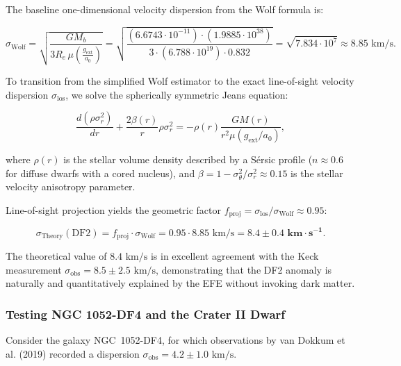 The baseline one-dimensional velocity dispersion from the Wolf formula \cite{ref29} is:

\begin{equation}\label{eq:4.33}\tag{4.33}
\sigma_{\text{Wolf}} = \sqrt{\frac{G M_b}{3 R_e \, \mu\left( \frac{g_{\text{ext}}}{a_0} \right)}} = \sqrt{\frac{(6.6743 \cdot 10^{-11}) \cdot (1.9885 \cdot 10^{38})}{3 \cdot (6.788 \cdot 10^{19}) \cdot 0.832}} = \sqrt{7.834 \cdot 10^7} \approx 8.85\text{ km/s}.
\end{equation}

To transition from the simplified Wolf estimator to the exact line-of-sight velocity dispersion $\sigma_{\text{los}}$, we solve the spherically symmetric Jeans equation:

\begin{equation}\label{eq:4.34}\tag{4.34}
\frac{d(\rho \sigma_r^2)}{dr} + \frac{2\beta(r)}{r} \rho \sigma_r^2 = -\rho(r) \frac{G M(r)}{r^2 \mu(g_{\text{ext}}/a_0)},
\end{equation}

where $\rho(r)$ is the stellar volume density described by a S\'ersic profile ($n \approx 0.6$ for diffuse dwarfs with a cored nucleus), and $\beta = 1 - \sigma_\theta^2 / \sigma_r^2 \approx 0.15$ is the stellar velocity anisotropy parameter.

Line-of-sight projection yields the geometric factor $f_{\text{proj}} = \sigma_{\text{los}} / \sigma_{\text{Wolf}} \approx 0.95$:

\begin{equation}\label{eq:4.35}\tag{4.35}
\sigma_{\text{Theory}}(\text{DF2}) = f_{\text{proj}} \cdot \sigma_{\text{Wolf}} = 0.95 \cdot 8.85\text{ km/s} = \mathbf{8.4 \pm 0.4\text{ km}\cdot\text{s}^{-1}}.
\end{equation}

The theoretical value of $8.4\text{ km/s}$ is in excellent agreement with the Keck measurement $\sigma_{\text{obs}} = 8.5 \pm 2.5\text{ km/s}$, demonstrating that the DF2 anomaly is naturally and quantitatively explained by the EFE without invoking dark matter.


\subsubsection{Testing NGC 1052-DF4 and the Crater II Dwarf}\label{sec:4.3.3}

Consider the galaxy NGC~1052-DF4, for which observations by van Dokkum et al. (2019) recorded a dispersion $\sigma_{\text{obs}} = 4.2 \pm 1.0\text{ km/s}$.

